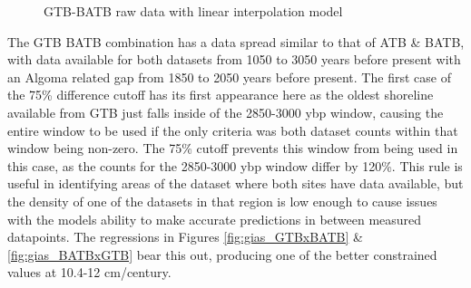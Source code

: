 \begin{figure}[h]
	\caption{GTB-BATB raw data with linear interpolation model}
	\label{fig:data_GTBxBATB}
\end{figure}
The GTB BATB combination has a data spread similar to that of ATB \& BATB, with
data available for both datasets from 1050 to 3050 years before present with an
Algoma related gap from 1850 to 2050 years before present. The first case of the
75\% difference cutoff has its first appearance here as the oldest shoreline available from GTB
just falls inside of the 2850-3000 ybp window, causing the entire window to be
used if the only criteria was both dataset counts within that window being non-zero.
The 75\% cutoff prevents this window from being used in this case, as the counts
for the 2850-3000 ybp window differ by 120\%. This rule is useful in identifying
areas of the dataset where both sites have data available, but the density of
one of the datasets in that region is low enough to cause issues with the models
ability to make accurate predictions in between measured datapoints.
The regressions in
Figures \ref{fig:gias_GTBxBATB} \& \ref{fig:gias_BATBxGTB} bear this out,
producing one of the better constrained values at 10.4-12 cm/century.
\newpage

